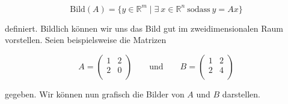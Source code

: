 \begin{equation*}
    \text{Bild}(A) = \{ y \in \mathbb{R}^m  \mid  \exists \ x \in \mathbb{R}^n \ \text{sodass} \ y = Ax \}
\end{equation*}

\vspace{0.25\baselineskip}

definiert. Bildlich können wir uns das Bild gut im zweidimensionalen Raum vorstellen. Seien beispielsweise die Matrizen

\begin{equation*}
    A = \begin{pmatrix}
        1 & 2 \\
        2 & 0 \\
    \end{pmatrix} \qquad \text{und} \qquad B = \begin{pmatrix}
        1 & 2 \\
        2 & 4 \\
    \end{pmatrix}
\end{equation*}

\vspace{0.25\baselineskip}

gegeben. Wir können nun grafisch die Bilder von \( A \) und \( B \) darstellen. 

